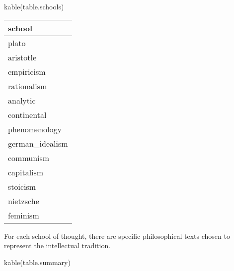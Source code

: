 \documentclass[
]{article}
\newenvironment{Shaded}{\begin{snugshade}}{\end{snugshade}}
\newcommand{\FunctionTok}[1]{\textcolor[rgb]{0.00,0.00,0.00}{#1}}
\newcommand{\NormalTok}[1]{#1}
\begin{document}
\begin{Shaded}
\begin{Highlighting}[]
\FunctionTok{kable}\NormalTok{(table.schools)}
\end{Highlighting}
\end{Shaded}

\begin{longtable}[]{@{}l@{}}
\toprule
school\tabularnewline
\midrule
\endhead
plato\tabularnewline
aristotle\tabularnewline
empiricism\tabularnewline
rationalism\tabularnewline
analytic\tabularnewline
continental\tabularnewline
phenomenology\tabularnewline
german\_idealism\tabularnewline
communism\tabularnewline
capitalism\tabularnewline
stoicism\tabularnewline
nietzsche\tabularnewline
feminism\tabularnewline
\bottomrule
\end{longtable}

For each school of thought, there are specific philosophical texts
chosen to represent the intellectual tradition.

\begin{Shaded}
\begin{Highlighting}[]
\FunctionTok{kable}\NormalTok{(table.summary)}
\end{Highlighting}
\end{Shaded}
\end{document}
